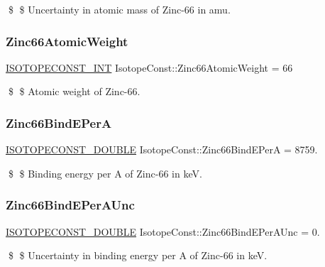 \$ \$ Uncertainty in atomic mass of Zinc-\/66 in amu. \mbox{\label{group___isotope_const-_zinc-_zn66_gad9fa25037eee7736786deeeb626b3338}} 
\subsubsection{\texorpdfstring{Zinc66\+Atomic\+Weight}{Zinc66AtomicWeight}}
{\footnotesize\ttfamily \mbox{\hyperlink{group___isotope_const-_macros_ga5f18360b3e99483a35c32d789e62621c}{I\+S\+O\+T\+O\+P\+E\+C\+O\+N\+S\+T\+\_\+\+I\+NT}} Isotope\+Const\+::\+Zinc66\+Atomic\+Weight = 66}

\$ \$ Atomic weight of Zinc-\/66. \mbox{\label{group___isotope_const-_zinc-_zn66_ga08683101f85ea8e5466c3aa4b4442988}} 
\subsubsection{\texorpdfstring{Zinc66\+Bind\+E\+PerA}{Zinc66BindEPerA}}
{\footnotesize\ttfamily \mbox{\hyperlink{group___isotope_const-_macros_ga8f45a7272ce02c0b4c65c44636ed719a}{I\+S\+O\+T\+O\+P\+E\+C\+O\+N\+S\+T\+\_\+\+D\+O\+U\+B\+LE}} Isotope\+Const\+::\+Zinc66\+Bind\+E\+PerA = 8759.}

\$ \$ Binding energy per A of Zinc-\/66 in keV. \mbox{\label{group___isotope_const-_zinc-_zn66_ga476621d9c21a4eb05eb8c0cbec338da9}} 
\subsubsection{\texorpdfstring{Zinc66\+Bind\+E\+Per\+A\+Unc}{Zinc66BindEPerAUnc}}
{\footnotesize\ttfamily \mbox{\hyperlink{group___isotope_const-_macros_ga8f45a7272ce02c0b4c65c44636ed719a}{I\+S\+O\+T\+O\+P\+E\+C\+O\+N\+S\+T\+\_\+\+D\+O\+U\+B\+LE}} Isotope\+Const\+::\+Zinc66\+Bind\+E\+Per\+A\+Unc = 0.}

\$ \$ Uncertainty in binding energy per A of Zinc-\/66 in keV. \mbox{\label{group___isotope_const-_zinc-_zn66_ga5f4f9ad546c80e31d82cae18cbf5cc14}} 
